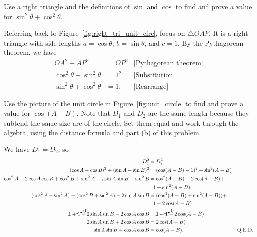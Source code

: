 \documentclass[../key.tex]{subfiles}
\begin{document}
\begin{inner_problem}
\item Use a right triangle and the definitions of $\sin$ and $\cos$ to find and prove a value for $\sin^2 \theta + \cos^2 \theta$.
\end{inner_problem}

\noindent Referring back to Figure~\ref{fig:right_tri_unit_circ}, focus on $\triangle OAP$. It is a right triangle with side lengths $a=\cos\theta$, $b=\sin\theta$, and $c=1$. By the Pythagorean theorem, we have
\begin{align*}
OA^2+AP^2&=OP^2 & \text{[Pythagorean theorem]} \\
\cos^2\theta + \sin^2\theta &= 1^2 & \text{[Substitution]} \\
\sin^2\theta + \cos^2\theta &= 1. & \text{[Rearrange]}
\end{align*}

\begin{inner_problem}
\item Use the picture of the unit circle in Figure~\ref{fig:unit_circle} to find and prove a value for $\cos(A-B)$. Note that $D_1$ and $D_2$ are the same length because they subtend the same size arc of the circle. Set them equal and work through the algebra, using the distance formula and part (b) of this problem.
\end{inner_problem}

\noindent We have $D_1=D_2$, so
\begin{align*}
D_1^2&=D_2^2 \\
(\cos A - \cos B)^2 + (\sin A - \sin B)^2 &= (\cos(A-B)-1)^2+\sin^2 (A-B) \\
\cos^2 A - 2\cos A\cos B + \cos^2 B + \sin^2 A - 2\sin A\sin B + \sin^2 B &= \cos^2 (A-B) - 2\cos(A-B) + \\ &\phantom{=} 1+\sin^2(A-B) \\
(\cos^2 A + \sin^2 A) + (\cos^2 B + \sin^2 A) - 2\sin A\sin B &= (\cos^2 (A-B) + \sin^2(A-B)) + \\ &\phantom{=} 1 - 2\cos(A-B) \\
\cancelto{0}{1 + 1} - 2\sin A\sin B - 2\cos A\cos B &= \cancelto{0}{1 + 1} - 2\cos(A-B) \\
2\sin A\sin B + 2\cos A\cos B &= 2\cos(A-B) \\
\sin A\sin B + \cos A\cos B &= \cos(A-B). & \text{Q.E.D.}
\end{align*}
\end{document}
